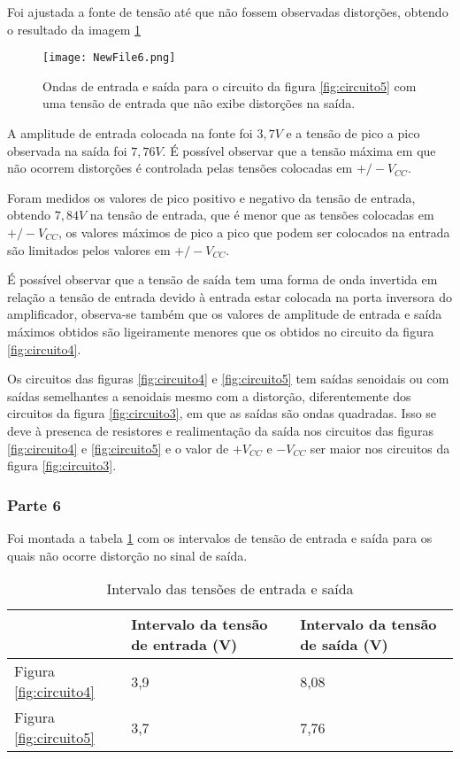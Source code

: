 \documentclass{abntex2}
\begin{document}
Foi ajustada a fonte de tensão até que não fossem observadas distorções, obtendo o resultado da imagem \ref{fig:inout6}
\begin{figure}[h]
  \centering
  \texttt{[image: NewFile6.png]}
  \caption{Ondas de entrada e saída para o circuito da figura \ref{fig:circuito5} com uma tensão de entrada que não exibe distorções na saída.}
  \label{fig:inout6}
\end{figure}

A amplitude de entrada colocada na fonte foi $3,7V$ e a tensão de pico a pico observada na saída foi $7,76V$. É possível observar que a tensão máxima em que não ocorrem distorções é controlada pelas tensões colocadas em $+/-V_{CC}$.

Foram medidos os valores de pico positivo e negativo da tensão de entrada, obtendo $7,84V$ na tensão de entrada, que é menor que as tensões colocadas em $+/-V_{CC}$, os valores máximos de pico a pico que podem ser colocados na entrada são limitados pelos valores em $+/-V_{CC}$.

É possível observar que a tensão de saída tem uma forma de onda invertida em relação a tensão de entrada devido à entrada estar colocada na porta inversora do amplificador, observa-se também que os valores de amplitude de entrada e saída máximos obtidos são ligeiramente menores que os obtidos no circuito da figura \ref{fig:circuito4}.

Os circuitos das figuras \ref{fig:circuito4} e \ref{fig:circuito5} tem saídas senoidais ou com saídas semelhantes a senoidais mesmo com a distorção, diferentemente dos circuitos da figura \ref{fig:circuito3}, em que as saídas são ondas quadradas. Isso se deve à presenca de resistores e realimentação da saída nos circuitos das figuras \ref{fig:circuito4} e \ref{fig:circuito5} e o valor de $+V_{CC}$ e $-V_{CC}$ ser maior nos circuitos da figura \ref{fig:circuito3}.
\subsubsection{Parte 6}

Foi montada a tabela \ref{tab:exp4} com os intervalos de tensão de entrada e saída para os quais não ocorre distorção no sinal de saída.

\begin{table}[h!]
\centering
\begin{tabular}{|l|l|l|}
  \hline
   & Intervalo da tensão de entrada (V) & Intervalo da tensão de saída (V) \\
  \hline
  Figura \ref{fig:circuito4} & 3,9 & 8,08 \\
  \hline
  Figura \ref{fig:circuito5} & 3,7 & 7,76 \\
  \hline
\end{tabular}
\caption{Intervalo das tensões de entrada e saída}
\label{tab:exp4}
\end{table}
\end{document}
